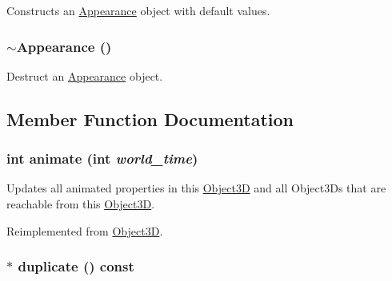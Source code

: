 Constructs an \hyperlink{classm3g_1_1Appearance}{Appearance} object with default values. \hypertarget{classm3g_1_1Appearance_c05c93d7a0f286cb9471b6c667ffeee1}{
\subsubsection[{$\sim$Appearance}]{\setlength{\rightskip}{0pt plus 5cm}$\sim${\bf Appearance} ()}}
\label{classm3g_1_1Appearance_c05c93d7a0f286cb9471b6c667ffeee1}


Destruct an \hyperlink{classm3g_1_1Appearance}{Appearance} object. 

\subsection{Member Function Documentation}
\hypertarget{classm3g_1_1Appearance_8aad1ceab4c2a03609c8a42324ce484d}{
\subsubsection[{animate}]{\setlength{\rightskip}{0pt plus 5cm}int animate (int {\em world\_\-time})}}
\label{classm3g_1_1Appearance_8aad1ceab4c2a03609c8a42324ce484d}


Updates all animated properties in this \hyperlink{classm3g_1_1Object3D}{Object3D} and all Object3Ds that are reachable from this \hyperlink{classm3g_1_1Object3D}{Object3D}. 

Reimplemented from \hyperlink{classm3g_1_1Object3D_8aad1ceab4c2a03609c8a42324ce484d}{Object3D}.\hypertarget{classm3g_1_1Appearance_ceaab703eb45cba7cf8705bc3a087127}{
\subsubsection[{duplicate}]{ $\ast$ duplicate () const}}
\label{classm3g_1_1Appearance_ceaab703eb45cba7cf8705bc3a087127}


